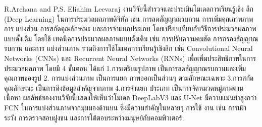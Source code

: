 {	 R.Archana and P.S. Eliahim Leevaraj \cite{8016501} งานวิจัยนี้สำรวจและประเมินโมเดลการเรียนรู้เชิง ลึก (Deep Learning) ในการประมวลผลภาพดิจิทัล เช่น การลดสัญญาณรบกวน การเพิ่มคุณภาพภาพ การ แบ่งส่วน การสกัดคุณลักษณะ และการจำแนกประเภท โดยเปรียบเทียบกับวิธีการประมวลผลภาพแบบดั้งเดิม โดยใช้ เทคนิคการประมวลผลภาพแบบดั้งเดิม เช่น การปรับความคมชัด การกรองสัญญาณรบกวน และการ แบ่งส่วนภาพ รวมถึงการใช้โมเดลการเรียนรู้เชิงลึก เช่น Convolutional Neural Networks (CNNs) และ Recurrent Neural Networks (RNNs) เพื่อเพิ่มประสิทธิภาพในการประมวลผลภาพ โดยมี 4 ขั้นตอน ได้แก่ 1.การเตรียมรูปภาพ เป็นการลดสัญญาณรบกวนและเพิ่มคุณภาพของรูป 2. การแบ่งส่วนภาพ เป็นการแยก ภาพออกเป็นส่วนๆ ตามลักษณะเฉพาะ 3.การสกัดคุณลักษณะ เป็นการดึงข้อมูลสำคัญจากภาพ 4.การจำแยก ประเภท เป็นการจัดหมวดหมู่ภาพตามเนื้อหา ผลลัพธ์ของงานวิจัยนี้แสดงให้เห็นว่าโมเดล DeepLabV3 และ U-Net มีความแม่นยำสูงกว่า FCN ในการแบ่งส่วนภาพจากมุมมองด้านบน ซึ่งมีความสำคัญในหลายๆ การใช้ งาน เช่น การเฝ้าระวัง การตรวจสอบฝูงชน และการโต้ตอบระหว่างมนุษย์กับคอมพิวเตอร์.}
	 
	

